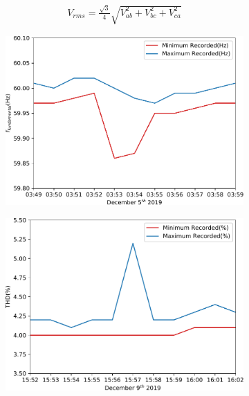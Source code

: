 \begin{equation}\label{eq:v_rms_3phaseN_to_signle}
\begin{aligned}
    V_{rms} = \frac{\sqrt{3}}{4}\sqrt{V_{ab}^2 + V_{bc}^2 +V_{ca}^2}
\end{aligned}
\end{equation}

\begin{figure}[ht!]
    \centering
    \begin{subfigure}{.45\textwidth}
        \centering
        \includegraphics[width=1\linewidth]{img/napali_eval/gt/gt_f_example.pdf}
        \caption{}
        \label{expdes:fig:gt_example:f}
    \end{subfigure}\hspace{5mm}
    \begin{subfigure}{.45\textwidth}
        \centering
        \includegraphics[width=1\linewidth]{img/napali_eval/gt/gt_thd_example.pdf}

\end{subfigure}
\end{figure}
